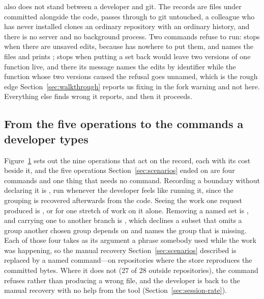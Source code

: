 \sgt{} also does not stand between a developer and git. The records are files under
 committed alongside the code,  passes through to git
untouched, a colleague who has never installed \sgt{} clones an ordinary repository
with an ordinary history, and there is no server and no background process. Two
commands refuse to run:  stops when there are unsaved edits, because
\sgt{} has nowhere to put them, and names the files and prints ;  stops
when putting a set back would leave two versions of one function live, and there its
message names the edits by identifier while the function whose two versions caused
the refusal goes unnamed, which is the rough edge Section~\ref{sec:walkthrough}
reports us fixing in the fork warning and not here. Everything else
\sgt{} finds wrong it reports, and then it proceeds.

\subsection{From the five operations to the commands a developer types}

\begin{figure}[t]
  \centering
  
  \Description{\FigFourDescription}
  \caption{\FigFourCaption}
  \label{fig:operations}
\end{figure}

Figure~\ref{fig:operations} sets out the nine operations that act on the record,
each with its cost beside it, and the five operations Section~\ref{sec:scenarios}
ended on are four commands and one thing that needs no command. Recording a
boundary without declaring it is
, run whenever the developer feels like running it, since the
grouping is recovered afterwards from the code. Seeing the work one request produced
is , or  for one
stretch of work on it alone. Removing a named set is
, and carrying one to another branch is
, which declines a subset that omits a group
another chosen group depends on and names the group that is missing. Each of those
four takes as its argument a phrase somebody used while the work was happening, so
the manual recovery Section~\ref{sec:scenarios} described is replaced by a named
command---on repositories where the store reproduces the committed bytes. Where
it does not (27 of 28 outside repositories), the command refuses rather than
producing a wrong file, and the developer is back to the manual recovery with no
help from the tool (Section~\ref{sec:session-rate}).

